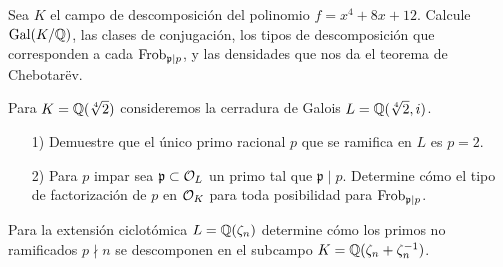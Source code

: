 \begin{ejercicio}
  Sea $K$ el campo de descomposición del polinomio $f = x^4 + 8x + 12$. Calcule
  $\operatorname{Gal} (K/\mathbb{Q})$, las clases de conjugación, los tipos de descomposición que
  corresponden a cada $\operatorname{Frob}_{\mathfrak{p}\mid p}$, y las densidades que nos da
  el teorema de Chebotarëv.
\end{ejercicio}

\begin{ejercicio}
  Para $K = \mathbb{Q} (\sqrt[4]{2})$ consideremos la cerradura de Galois
  $L = \mathbb{Q} (\sqrt[4]{2},i)$.

  \begin{enumerate}
  \item[1)] Demuestre que el único primo racional $p$ que se ramifica en $L$ es
    $p = 2$.

  \item[2)] Para $p$ impar sea $\mathfrak{p} \subset \mathcal{O}_L$ un primo tal que
    $\mathfrak{p} \mid p$. Determine cómo el tipo de factorización de $p$ en
    $\mathcal{O}_K$ para toda posibilidad para $\operatorname{Frob}_{\mathfrak{p}|p}$.
  \end{enumerate}
\end{ejercicio}

\begin{ejercicio}
  Para la extensión ciclotómica $L = \mathbb{Q} (\zeta_n)$ determine cómo los primos
  no ramificados $p\nmid n$ se descomponen en el subcampo
  $K = \mathbb{Q} (\zeta_n + \zeta_n^{-1})$.
\end{ejercicio}
